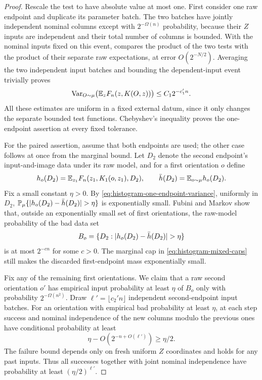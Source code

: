 \begin{proof}
Rescale the test to have absolute value at most one. First consider
one raw endpoint and duplicate its parameter batch. The two batches
have jointly independent nominal columns except with
$2^{-\Omega(n)}$ probability, because their $Z$ inputs are independent
and their total number of columns is bounded. With the nominal inputs
fixed on this event,  compares the
product of the two tests with the product of their separate raw
expectations, at error $O(2^{-N/2})$. Averaging the two independent
input batches and bounding the dependent-input event trivially proves
\begin{equation}\label{eq:histogram-one-endpoint-variance}
 \operatorname{Var}_{O\sim\mu}\bigl(\mathbb E_zF_n(z,K(O,z))\bigr)
 \le C_1 2^{-c_1'n}.
\end{equation}
All these estimates are uniform in a fixed external datum, since it
only changes the separate bounded test functions. Chebyshev's
inequality proves the one-endpoint assertion at every fixed
tolerance.

For the paired assertion, assume that both endpoints are used; the
other case follows at once from the marginal bound. Let $D_2$ denote
the second endpoint's input-and-image data under its raw model, and
for a first orientation $o$ define
\[
 h_o(D_2)=\mathbb E_{z_1}F_n(z_1,K_1(o,z_1),D_2),\qquad
 \bar h(D_2)=\mathbb E_{o\sim\mu}h_o(D_2).
\]
Fix a small constant $\eta>0$. By
\eqref{eq:histogram-one-endpoint-variance}, uniformly in $D_2$,
$\mathbb P_\mu\{\lvert h_o(D_2)-\bar h(D_2)\rvert>\eta\}$ is exponentially
small. Fubini and Markov show that, outside an exponentially small
set of first orientations, the raw-model probability of the bad data
set
\[
 B_o=\{D_2:\lvert h_o(D_2)-\bar h(D_2)\rvert>\eta\}
\]
is at most $2^{-c n}$ for some $c>0$. The marginal cap in
\eqref{eq:histogram-mixed-caps} still makes the discarded
first-endpoint mass exponentially small.

Fix any of the remaining first orientations. We claim that a raw
second orientation $o'$ has empirical input probability at least
$\eta$ of $B_o$ only with probability $2^{-\Omega(n^2)}$. Draw
$\ell'=\lfloor c_2'n\rfloor$ independent second-endpoint input
batches. For an orientation with empirical bad probability at least
$\eta$, at each step success and nominal independence of the new
columns modulo the previous ones have conditional probability at
least
\[
 \eta-O(2^{-n+O(\ell')})\ge\eta/2.
\]
The failure bound depends only on fresh uniform $Z$ coordinates and
holds for any past inputs. Thus all successes together with joint
nominal independence have probability at least $(\eta/2)^{\ell'}$.


\end{proof}
